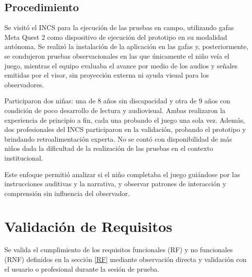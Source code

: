 \subsection{Procedimiento}
Se visitó el INCS para la ejecución de las pruebas en campo, utilizando gafas Meta Quest 2 como dispositivo de ejecución del prototipo en su modalidad autónoma. Se realizó la instalación de la aplicación en las gafas y, posteriormente, se condujeron pruebas observacionales en las que únicamente el niño veía el juego, mientras el equipo evaluaba el avance por medio de los audios y señales emitidas por el visor, sin proyección externa ni ayuda visual para los observadores. 

Participaron dos niñas: una de 8 años sin discapacidad y otra de 9 años con condición de poco desarrollo de lectura y audiovisual. Ambas realizaron la experiencia de principio a fin, cada una probando el juego una sola vez. Además, dos profesionales del INCS participaron en la validación, probando el prototipo y brindando retroalimentación experta. No se contó con disponibilidad de más niños dada la dificultad de la realización de las pruebas en el contexto institucional.

Este enfoque permitió analizar si el niño completaba el juego guiándose por las instrucciones auditivas y la narrativa, y observar patrones de interacción y comprensión sin influencia del observador.

\section{Validación de Requisitos}
Se valida el cumplimiento de los requisitos funcionales (RF) y no funcionales (RNF) definidos en la sección \ref{RF} mediante observación directa y validación con el usuario o profesional durante la sesión de prueba.

